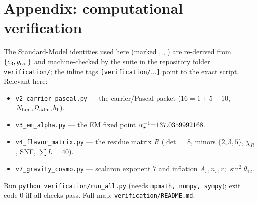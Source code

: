 

\section*{Appendix: computational verification}
The Standard-Model identities used here (marked \mE, \mE, \mE) are re-derived from $\{c_3,g_{\mathrm{car}}\}$ and
machine-checked by the suite in the repository folder \texttt{verification/}; the inline tags
\texttt{[verification/$\dots$]} point to the exact script. Relevant here:
\begin{itemize}[leftmargin=1.4em,itemsep=1pt]
\item \texttt{v2\_carrier\_pascal.py} --- the carrier/Pascal packet ($16{=}1{+}5{+}10$, $N_{\mathrm{fam}},\Omega_{\mathrm{adm}},b_1$).
\item \texttt{v3\_em\_alpha.py} --- the EM fixed point $\alpha^{-1}_\star{=}137.0359992168$.
\item \texttt{v4\_flavor\_matrix.py} --- the residue matrix $R$ ($\det{=}8$, minors $\{2,3,5\}$, $\chi_R$, SNF, $\sum L{=}40$).
\item \texttt{v7\_gravity\_cosmo.py} --- scalaron exponent $7$ and inflation $A_s,n_s,r$; $\sin^2\theta_{12}$.
\end{itemize}
Run \texttt{python verification/run\_all.py} (needs \texttt{mpmath, numpy, sympy}); exit code $0$ iff all
checks pass. Full map: \texttt{verification/README.md}.




